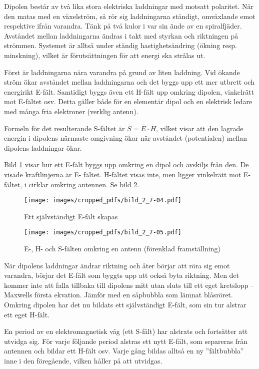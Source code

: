 Dipolen består av två lika stora elektriska laddningar med motsatt polaritet.
När den matas med en växelström, så rör sig laddningarna ständigt,
omväxlande emot respektive ifrån varandra.
Tänk på två kulor i var sin ände av en spiralfjäder.
Avståndet mellan laddningarna ändras i takt med styrkan och riktningen på
strömmen.
Systemet är alltså under ständig hastighetsändring (ökning resp. minskning),
vilket är förutsättningen för att energi ska strålas ut.

Först är laddningarna nära varandra på grund av liten laddning.
Vid ökande ström ökar avståndet mellan laddningarna och det byggs upp ett
mer utbrett och energirikt E-fält.
Samtidigt byggs även ett H-fält upp omkring dipolen, vinkelrätt mot E-fältet
osv.
Detta gäller både för en elementär dipol och en elektrisk ledare med många fria
elektroner (verklig antenn).

Formeln för det resulterande S-fältet är \(\overline{S} =
\overline{E}\cdot\overline{H}\), vilket visar att den lagrade energin
i dipolens närmaste omgivning ökar när avståndet (potentialen) mellan
dipolens laddningar ökar.

Bild \ref{fig:BildII7-04} visar hur ett E-fält byggs upp omkring en dipol och
avskiljs från den.
De visade kraftlinjerna är E- fältet.
H-fältet visas inte, men ligger vinkelrätt mot E-fältet, i cirklar omkring
antennen. Se bild \ref{fig:BildII7-05}.

\begin{figure}
\texttt{[image: images/cropped\_pdfs/bild\_2\_7-04.pdf]}
\caption{Ett självständigt E-fält skapas}
\label{fig:BildII7-04}
\end{figure}

\begin{figure}
\texttt{[image: images/cropped\_pdfs/bild\_2\_7-05.pdf]}
\caption{E-, H- och S-fälten omkring en antenn (förenklad framställning)}
\label{fig:BildII7-05}
\end{figure}

När dipolens laddningar ändrar riktning och åter börjar att röra sig
emot varandra, börjar det E-fält som byggts upp att också byta riktning.
Men det kommer inte att falla tillbaka till dipolens mitt
utan sluts till ett eget kretslopp -- Maxwells första ekvation.
Jämför med en såpbubbla som lämnat blåsröret.
Omkring dipolen har det nu bildats ett självständigt E-fält, som sin tur
alstrar ett eget H-fält.

En period av en elektromagnetisk våg (ett S-fält) har alstrats och
fortsätter att utvidga sig.
För varje följande period alstras ett nytt E-fält, som separeras från antennen
och bildar ett H-fält osv.
Varje gång bildas alltså en ny ''fältbubbla'' inne i den föregående, vilken
håller på att utvidgas.

